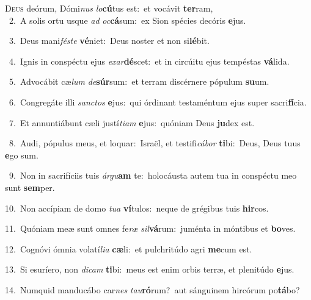 \lettrine{\initial\textcolor{\initialcolor}{D}}{eus} deórum, Dómi\textit{nus} \textit{lo}\-\textbf{cú}tus est:~\star et vocávit \textbf{ter}\-ram,\\
{\numbfont\textcolor{\numbcolor}{~2.}}~A solis ortu usque \textit{ad} \textit{oc}\-\textbf{cá}sum:~\star ex Sion spécies decóris \textbf{e}\-jus.\par
{\numbfont\textcolor{\numbcolor}{~3.}}~Deus mani\-\textit{fés}\-\textit{te} \textbf{vé}\-niet:~\star Deus noster et non si\-\textbf{lé}\-bit.\par
{\numbfont\textcolor{\numbcolor}{~4.}}~Ignis in conspéctu ejus \textit{ex}\-\textit{ar}\textbf{dé}scet:~\star et in circúitu ejus tempéstas \textbf{vá}\-lida.\par
{\numbfont\textcolor{\numbcolor}{~5.}}~Advocábit cæ\textit{lum} \textit{de}\-\textbf{súr}sum:~\star et terram discérnere pópulum \textbf{su}\-um.\par
{\numbfont\textcolor{\numbcolor}{~6.}}~Congregáte illi \textit{sanc}\-\textit{tos} \textbf{e}\-jus:~\star qui órdinant testaméntum ejus super sacri\-\textbf{fí}\-cia.\par
{\numbfont\textcolor{\numbcolor}{~7.}}~Et annuntiábunt cæli justí\-\textit{ti}\-\textit{am} \textbf{e}\-jus:~\star quóniam Deus \textbf{ju}\-dex est.\par
{\numbfont\textcolor{\numbcolor}{~8.}}~Audi, pópulus meus, et loquar:~\dagger Israël, et testifi\-\textit{cá}\-\textit{bor} \textbf{ti}\-bi:~\star Deus, Deus tuus \textbf{e}\-go sum.\par
{\numbfont\textcolor{\numbcolor}{~9.}}~Non in sacrifíciis tuis \textit{ár}\-\textit{gu}\textbf{am} te:~\star holocáusta autem tua in conspéctu meo sunt \textbf{sem}\-per.\par
{\numbfont\textcolor{\numbcolor}{10.}}~Non accípiam de domo \textit{tu}\-\textit{a} \textbf{ví}\-tulos:~\star neque de grégibus tuis \textbf{hir}\-cos.\par
{\numbfont\textcolor{\numbcolor}{11.}}~Quóniam meæ sunt omnes fe\textit{ræ} \textit{sil}\-\textbf{vá}rum:~\star juménta in móntibus et \textbf{bo}\-ves.\par
{\numbfont\textcolor{\numbcolor}{12.}}~Cognóvi ómnia volatí\-\textit{li}\-\textit{a} \textbf{cæ}\-li:~\star et pulchritúdo agri \textbf{me}\-cum est.\par
{\numbfont\textcolor{\numbcolor}{13.}}~Si esuríero, non \textit{di}\-\textit{cam} \textbf{ti}\-bi:~\star meus est enim orbis terræ, et plenitúdo \textbf{e}\-jus.\par
{\numbfont\textcolor{\numbcolor}{14.}}~Numquid manducábo car\textit{nes} \textit{tau}\-\textbf{ró}rum?~\star aut sánguinem hircórum po\-\textbf{tá}\-bo?\par

